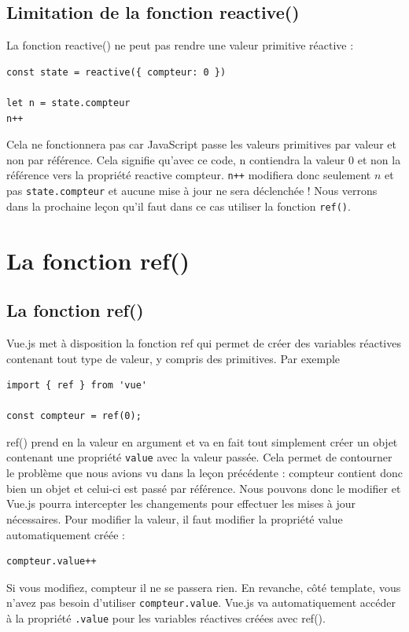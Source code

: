 \documentclass{article}
\begin{document}
\subsection{Limitation de la fonction {\color{monOrange}reactive()}}
La fonction {\color{monOrange}reactive()} ne peut pas rendre une valeur primitive réactive :
\begin{verbatim}
const state = reactive({ compteur: 0 })

let n = state.compteur
n++
\end{verbatim}

Cela ne fonctionnera pas car JavaScript passe les valeurs primitives par valeur et non par référence. Cela signifie qu'avec ce code, n contiendra la valeur 0 et non la référence vers la propriété {\color{monOrange}reactive compteur}. {\tt n++} modifiera donc seulement $n$ et pas {\tt state.compteur} et aucune mise à jour ne sera déclenchée ! Nous verrons dans la prochaine leçon qu'il faut dans ce cas utiliser la fonction {\tt ref()}.


\section{La fonction ref()}
\subsection{La fonction ref()}
{\color{monOrange}Vue.js} met à disposition la fonction {\color{monOrange}ref} qui permet de créer des variables réactives contenant tout type de valeur, y compris des primitives. Par exemple
\begin{verbatim}
import { ref } from 'vue'

const compteur = ref(0);
\end{verbatim}
{\color{monOrange}ref()} prend en la valeur en argument et va en fait tout simplement créer un objet contenant une propriété {\tt value} avec la valeur passée. Cela permet de contourner le problème que nous avions vu dans la leçon précédente : compteur contient donc bien un objet et celui-ci est passé par référence. Nous pouvons donc le modifier et {\color{monOrange}Vue.js} pourra intercepter les changements pour effectuer les mises à jour nécessaires. Pour modifier la valeur, il faut modifier la propriété value automatiquement créée :
\begin{verbatim}
compteur.value++
\end{verbatim}
Si vous modifiez, compteur il ne se passera rien. En revanche, côté {\color{monOrange}template}, vous n'avez pas besoin d'utiliser {\tt compteur.value}. {\color{monOrange}Vue.js} va automatiquement accéder à la propriété {\tt .value} pour les variables réactives créées avec {\color{monOrange}ref()}.
\end{document}
